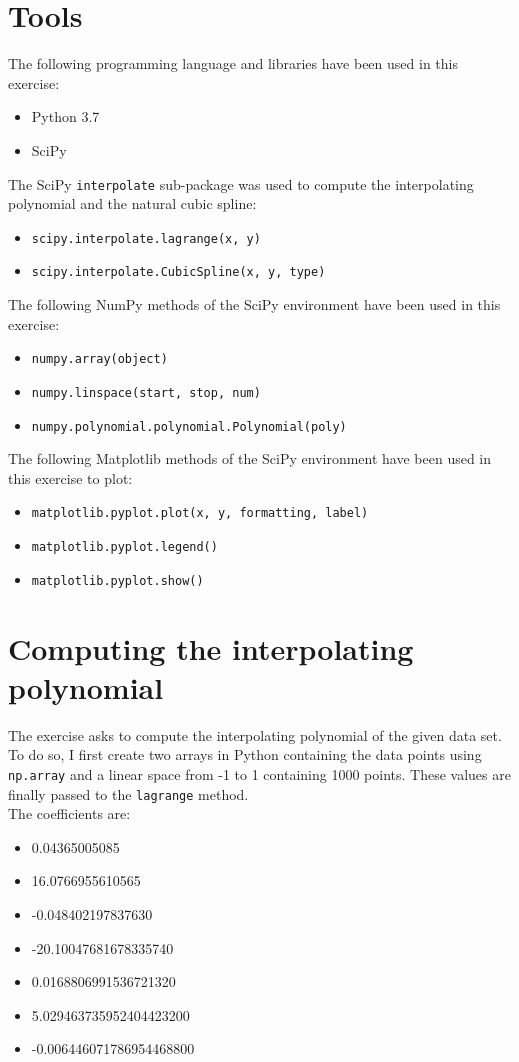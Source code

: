 \documentclass{article}
\newcommand{\code}{\texttt}
\begin{document}
\section{Tools}
The following programming language and libraries have been used in this exercise:
\begin{itemize}
  \item Python 3.7
  \item SciPy
\end{itemize}
The SciPy \code{interpolate} sub-package was used to compute the interpolating polynomial and the natural cubic spline:
\begin{itemize}
  \item \code{scipy.interpolate.lagrange(x, y)}
  \item \code{scipy.interpolate.CubicSpline(x, y, type)}
\end{itemize}

The following NumPy methods of the SciPy environment have been used in this exercise:
\begin{itemize}
  \item \code{numpy.array(object)}
  \item \code{numpy.linspace(start, stop, num)}
  \item \code{numpy.polynomial.polynomial.Polynomial(poly)}
  \end{itemize}
The following Matplotlib methods of the SciPy environment have been used in this exercise to plot:
 \begin{itemize}
  \item \code{matplotlib.pyplot.plot(x, y, formatting, label)}
  \item \code{matplotlib.pyplot.legend()}
  \item \code{matplotlib.pyplot.show()}
  \end{itemize}
  
\section{Computing the interpolating polynomial}
The exercise asks to compute the interpolating polynomial of the given data set. To do so, I first create two arrays in Python containing the data points using \code{np.array} and a linear space from -1 to 1 containing 1000 points. These values are finally passed to the \code{lagrange} method. \\

The coefficients are: 
 \begin{itemize}
  \item 0.04365005085
  \item 16.0766955610565
  \item -0.048402197837630
  \item -20.10047681678335740
  \item 0.0168806991536721320
  \item 5.029463735952404423200
  \item -0.006446071786954468800
  \end{itemize}
\end{document}
